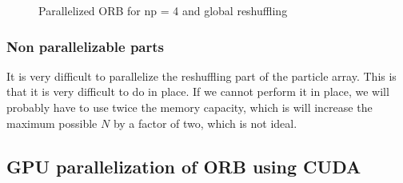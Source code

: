 \documentclass[]{article}
\begin{document}
\begin{figure}[H]
	\begin{center}
	\end{center}
	\caption{Parallelized ORB for np = 4 and global reshuffling}
	\label{fig:orb_parallel}
\end{figure}

\vspace{5mm}

\subsubsection{Non parallelizable parts}
It is very difficult to parallelize the reshuffling part of the particle array. This is that it is very difficult to do in place. If we cannot perform it in place, we will probably have to use twice the memory capacity, which is will increase the maximum possible $N$ by a factor of two, which is not ideal.


\subsection{GPU parallelization of ORB using CUDA }



\end{document}
